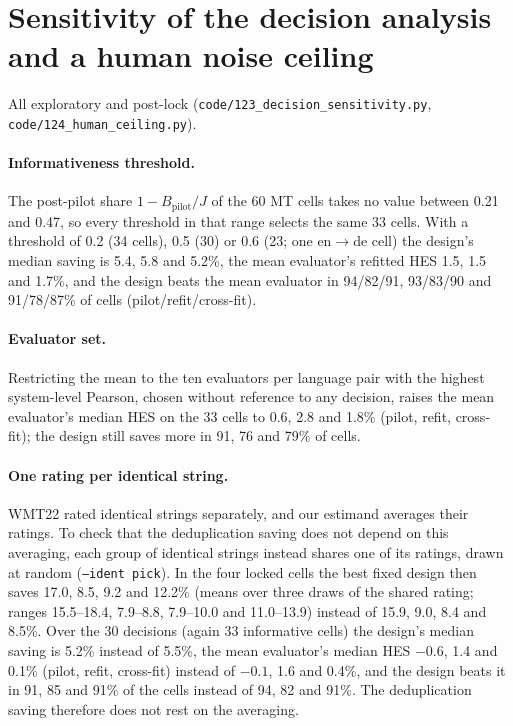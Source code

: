 \documentclass[11pt]{article}
\newcommand{\Bp}{B_{\mathrm{pilot}}}
\begin{document}
\section{Sensitivity of the decision analysis and a human noise ceiling}\label{app:sens}
All exploratory and post-lock (\texttt{code/123\_decision\_sensitivity.py}, \texttt{code/124\_human\_ceiling.py}).

\paragraph{Informativeness threshold.} The post-pilot share $1-\Bp/J$ of the 60 MT cells takes no value between 0.21 and
0.47, so every threshold in that range selects the same 33 cells. With a threshold of 0.2 (34 cells), 0.5 (30) or 0.6
(23; one en$\to$de cell) the design's median saving is 5.4, 5.8 and 5.2\%, the mean evaluator's refitted HES 1.5, 1.5 and
1.7\%, and the design beats the mean evaluator in 94/82/91, 93/83/90 and 91/78/87\% of cells (pilot/refit/cross-fit).

\paragraph{Evaluator set.} Restricting the mean to the ten evaluators per language pair with the highest system-level
Pearson, chosen without reference to any decision, raises the mean evaluator's median HES on the 33 cells to 0.6, 2.8 and
1.8\% (pilot, refit, cross-fit); the design still saves more in 91, 76 and 79\% of cells.

\paragraph{One rating per identical string.} WMT22 rated identical strings separately, and our estimand averages their
ratings. To check that the deduplication saving does not depend on this averaging, each group of identical strings
instead shares one of its ratings, drawn at random (\texttt{--ident pick}). In the four locked cells the best fixed design
then saves 17.0, 8.5, 9.2 and 12.2\% (means over three draws of the shared rating; ranges 15.5--18.4, 7.9--8.8, 7.9--10.0
and 11.0--13.9) instead of 15.9, 9.0, 8.4 and 8.5\%. Over the 30 decisions (again 33 informative cells) the design's median saving is 5.2\% instead of 5.5\%, the mean
evaluator's median HES $-0.6$, 1.4 and 0.1\% (pilot, refit, cross-fit) instead of $-0.1$, 1.6 and 0.4\%, and the design
beats it in 91, 85 and 91\% of the cells instead of 94, 82 and 91\%. The deduplication saving therefore does not rest on
the averaging.
\end{document}
